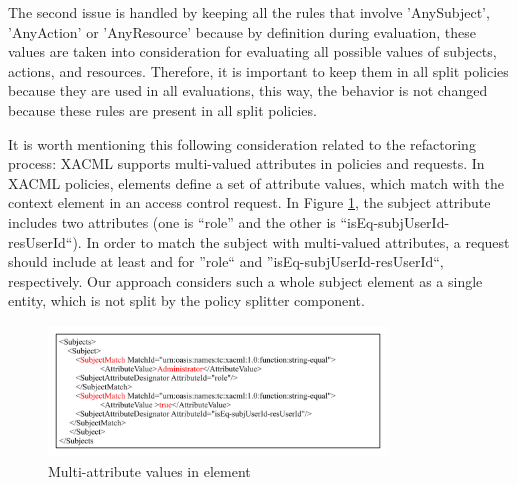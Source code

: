 The second issue is handled by keeping all the rules that involve 'AnySubject', 'AnyAction' or 'AnyResource' because by definition during 
evaluation, these values are taken into consideration for evaluating all possible values of subjects, actions, and resources. 
Therefore, it is important to keep them in all split policies because they are used in all evaluations, this way, the behavior is not changed because these rules are present in all split policies. 




It is worth mentioning this following consideration related to the refactoring process:
XACML supports multi-valued attributes in policies and requests. In XACML policies,  elements define a set of attribute values, which match with 
the context element in 
an access control request. In Figure \ref{xacml-match}, the subject attribute includes two attributes (one is ``role'' and the other 
is ``isEq-subjUserId-resUserId``). In order to match the subject with multi-valued attributes, a request should include at least  and  
for ''role`` and ''isEq-subjUserId-resUserId``, respectively.
Our approach considers such a whole subject element as a single entity, which is not split by the policy splitter component.
\begin{figure}[!h]
\begin{center}
\includegraphics[width=9cm, height=3.5cm]{xacml-match}
\caption{Multi-attribute values in  element}
\label{xacml-match}
\end{center}
\end{figure}

